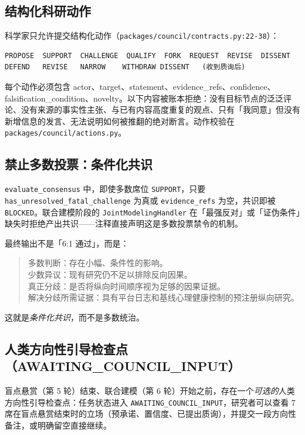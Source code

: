\subsection{结构化科研动作}

科学家只允许提交结构化动作（\texttt{packages/council/contracts.py:22-38}）：

\begin{lstlisting}
PROPOSE  SUPPORT  CHALLENGE  QUALIFY  FORK  REQUEST  REVISE  DISSENT
DEFEND   REVISE   NARROW    WITHDRAW DISSENT   (收到质询后)
\end{lstlisting}

每个动作必须包含 actor、target、statement、evidence\_refs、confidence、falsification\_condition、novelty。以下内容被账本拒绝：没有目标节点的泛泛评论、没有来源的事实性主张、与已有内容高度重复的观点、只有「我同意」但没有新增信息的发言、无法说明如何被推翻的绝对断言。动作校验在 \texttt{packages/council/actions.py}。

\subsection{禁止多数投票：条件化共识}

\texttt{evaluate\_consensus} 中，即使多数席位 \texttt{SUPPORT}，只要 \texttt{has\_unresolved\_fatal\_challenge} 为真或 \texttt{evidence\_refs} 为空，共识即被 \texttt{BLOCKED}。联合建模阶段的 \texttt{JointModelingHandler} 在「最强反对」或「证伪条件」缺失时拒绝产出共识——注释直接声明这是多数投票禁令的机制。

最终输出不是「6:1 通过」，而是：

\begin{quote}
多数判断：存在小幅、条件性的影响。\\
少数异议：现有研究仍不足以排除反向因果。\\
真正分歧：是否将纵向时间顺序视为足够的因果证据。\\
解决分歧所需证据：具有平台日志和基线心理健康控制的预注册纵向研究。
\end{quote}

这就是\emph{条件化共识}，而不是多数统治。

\subsection{人类方向性引导检查点（AWAITING\_COUNCIL\_INPUT）}

盲点悬赏（第 5 轮）结束、联合建模（第 6 轮）开始之前，存在一个\emph{可选的}人类方向性引导检查点：任务状态进入 \texttt{AWAITING\_COUNCIL\_INPUT}，研究者可以查看 7 席在盲点悬赏结束时的立场（预承诺、置信度、已提出质询），并提交一段方向性备注，或明确留空直接继续。


